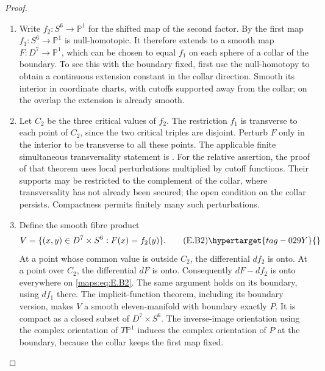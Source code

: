 \begin{proof}
\begin{enumerate}[label={$\langle1\rangle$\arabic*.},leftmargin=*]
\item Write $f_2:S^6\to\mathbb P^1$ for the shifted map of the second
factor. By  the first map $f_1:S^6\to\mathbb P^1$ is
null-homotopic. It therefore extends to a smooth map
$F:D^7\to\mathbb P^1$, which can be chosen to equal $f_1$ on
each sphere of a collar of the boundary. To see this with the
boundary fixed, first use the null-homotopy to obtain a continuous
extension constant in the collar direction. Smooth its interior
in coordinate charts, with cutoffs supported away from the collar;
on the overlap the extension is already smooth.

\item Let $C_2$ be the three critical values of $f_2$. The restriction
$f_1$ is transverse to each point of $C_2$, since the two critical
triples are disjoint. Perturb $F$ only in the interior to be
transverse to all these points. The applicable finite simultaneous
transversality statement is
\cite[Chapter 3, Section 2, Theorems 2.1 and 2.5]{rootHirsch76}.
For the relative assertion, the proof of that theorem uses local
perturbations multiplied by cutoff functions. Their supports may
be restricted to the complement of the collar, where
transversality has not already been secured; the open condition
on the collar persists. Compactness permits finitely many such
perturbations. 

\item Define the smooth fibre product
\[
 V=\{(x,y)\in D^7\times S^6:F(x)=f_2(y)\}.
 \tag{E.B2}\hypertarget{tag-029Y}{}\label{maps:eq:E.B2}
\]
At a point whose common value is outside $C_2$, the differential
$df_2$ is onto. At a point over $C_2$, the differential $dF$ is
onto. Consequently $dF-df_2$ is onto everywhere on \eqref{maps:eq:E.B2}.
The same argument holds on its boundary, using $df_1$ there.
The implicit-function theorem, including its boundary version,
makes $V$ a smooth eleven-manifold with boundary exactly $P$.
It is compact as a closed subset of $D^7\times S^6$.
The inverse-image orientation using the complex orientation of
$T\mathbb P^1$ induces the complex orientation of $P$ at the
boundary, because the collar keeps the first map fixed.


\end{enumerate}
\end{proof}
